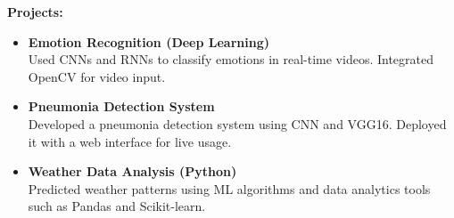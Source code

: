 \documentclass[a4paper,12pt]{article}
\begin{document}
\vspace{1em}
\noindent
\textbf{Projects:}
\begin{itemize}[leftmargin=*]
    \item \textbf{Emotion Recognition (Deep Learning)} \\
    Used CNNs and RNNs to classify emotions in real-time videos. Integrated OpenCV for video input.
    
    \item \textbf{Pneumonia Detection System} \\
    Developed a pneumonia detection system using CNN and VGG16. Deployed it with a web interface for live usage.

    \item \textbf{Weather Data Analysis (Python)} \\
    Predicted weather patterns using ML algorithms and data analytics tools such as Pandas and Scikit-learn.
\end{itemize}
\end{document}
